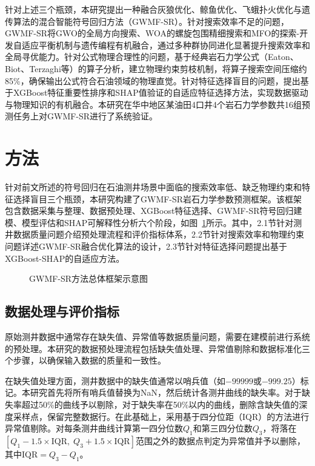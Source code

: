 \documentclass[a4paper,12pt]{ctexart}
\begin{document}
针对上述三个瓶颈，本研究提出一种融合灰狼优化、鲸鱼优化、飞蛾扑火优化与遗传算法的混合智能符号回归方法（GWMF-SR）。针对搜索效率不足的问题，GWMF-SR将GWO的全局方向搜索、WOA的螺旋包围精细搜索和MFO的探索-开发自适应平衡机制与遗传编程有机融合，通过多种群协同进化显著提升搜索效率和全局寻优能力。针对公式物理合理性的问题，基于经典岩石力学公式（Eaton、Biot、Terzaghi等）的算子分析，建立物理约束剪枝机制，将算子搜索空间压缩约85\%，确保输出公式符合石油领域的物理直觉。针对特征选择盲目的问题，提出基于XGBoost特征重要性排序和SHAP值验证的自适应特征选择方法，实现数据驱动与物理知识的有机融合。本研究在华中地区某油田4口井4个岩石力学参数共16组预测任务上对GWMF-SR进行了系统验证。

\section{方法}

针对前文所述的符号回归在石油测井场景中面临的搜索效率低、缺乏物理约束和特征选择盲目三个瓶颈，本研究构建了GWMF-SR岩石力学参数预测框架。该框架包含数据采集与整理、数据预处理、XGBoost特征选择、GWMF-SR符号回归建模、模型评估和SHAP可解释性分析六个阶段，如图~\ref{fig:framework}所示。其中，2.1节针对测井数据质量问题介绍预处理流程和评价指标体系，2.2节针对搜索效率和物理约束问题详述GWMF-SR融合优化算法的设计，2.3节针对特征选择问题提出基于XGBoost-SHAP的自适应方法。

\begin{figure}[htbp]
\centering
{}
\caption{GWMF-SR方法总体框架示意图}
\label{fig:framework}
\end{figure}

\subsection{数据处理与评价指标}

原始测井数据中通常存在缺失值、异常值等数据质量问题，需要在建模前进行系统的预处理。本研究的数据预处理流程包括缺失值处理、异常值剔除和数据标准化三个步骤，以确保输入数据的质量和一致性。

在缺失值处理方面，测井数据中的缺失值通常以哨兵值（如$-99999$或$-999.25$）标记。本研究首先将所有哨兵值替换为NaN，然后统计各测井曲线的缺失率。对于缺失率超过50\%的曲线予以剔除，对于缺失率在50\%以内的曲线，删除含缺失值的深度采样点，保留完整数据行。在此基础上，采用基于四分位距（IQR）的方法进行异常值剔除。对每条测井曲线计算第一四分位数$Q_1$和第三四分位数$Q_3$，将落在$[Q_1 - 1.5 \times \text{IQR},\; Q_3 + 1.5 \times \text{IQR}]$范围之外的数据点判定为异常值并予以删除，其中$\text{IQR} = Q_3 - Q_1$。
\end{document}
